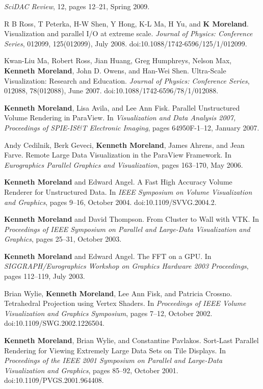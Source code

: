 \begin{enumerate}[label={[\arabic*]}, left=0pt]
  \emph{SciDAC Review}, 12, pages 12--21, Spring 2009.
\item  %
  R B Ross, T Peterka, H-W Shen, Y Hong, K-L Ma, H Yu, and \textbf{K Moreland}.
  Visualization and parallel {I/O} at extreme scale.
  \emph{Journal of Physics: Conference Series}, 012099, 125(012099), July 2008.
  doi:10.1088/1742-6596/125/1/012099.
\item  %
  Kwan-Liu Ma, Robert Ross, Jian Huang, Greg Humphreys, Nelson Max, \textbf{Kenneth Moreland}, John D. Owens, and Han-Wei Shen.
  Ultra-Scale Visualization: Research and Education.
  \emph{Journal of Physics: Conference Series}, 012088, 78(012088), June 2007.
  doi:10.1088/1742-6596/78/1/012088.
\item  %
  \textbf{Kenneth Moreland}, Lisa Avila, and Lee Ann Fisk.
  Parallel Unstructured Volume Rendering in ParaView.
  In \emph{Visualization and Data Analysis 2007, Proceedings of SPIE-IS\&T Electronic Imaging}, pages 64950F-1--12, January 2007.
\item  %
  Andy Cedilnik, Berk Geveci, \textbf{Kenneth Moreland}, James Ahrens, and Jean Farve.
  Remote Large Data Visualization in the {ParaView} Framework.
  In \emph{Eurographics Parallel Graphics and Visualization}, pages 163--170, May 2006.
\item  %
  \textbf{Kenneth Moreland} and Edward Angel.
  A Fast High Accuracy Volume Renderer for Unstructured Data.
  In \emph{IEEE Symposium on Volume Visualization and Graphics}, pages 9--16, October 2004.
  doi:10.1109/SVVG.2004.2.
\item  %
  \textbf{Kenneth Moreland} and David Thompson.
  From Cluster to Wall with {VTK}.
  In \emph{Proceedings of IEEE Symposium on Parallel and Large-Data Visualization and Graphics}, pages 25--31, October 2003.
\item  %
  \textbf{Kenneth Moreland} and Edward Angel.
  {The FFT on a GPU}.
  In \emph{SIGGRAPH/Eurographics Workshop on Graphics Hardware 2003 Proceedings}, pages 112--119, July 2003.
\item  %
  Brian Wylie, \textbf{Kenneth Moreland}, Lee Ann Fisk, and Patricia Crossno.
  Tetrahedral Projection using Vertex Shaders.
  In \emph{Proceedings of IEEE Volume Visualization and Graphics Symposium}, pages 7--12, October 2002.
  doi:10.1109/SWG.2002.1226504.
\item  %
  \textbf{Kenneth Moreland}, Brian Wylie, and Constantine Pavlakos.
  Sort-Last Parallel Rendering for Viewing Extremely Large Data Sets on Tile Displays.
  In \emph{Proceedings of the IEEE 2001 Symposium on Parallel and Large-Data Visualization and Graphics}, pages 85--92, October 2001.
  doi:10.1109/PVGS.2001.964408.
\end{enumerate}
